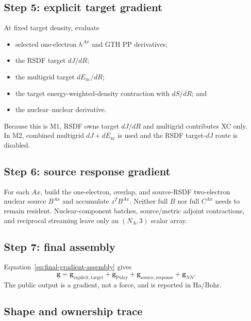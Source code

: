 \subsection{Step 5: explicit target gradient}

At fixed target density, evaluate
\begin{itemize}
  \item selected one-electron $h^{Ax}$ and GTH PP derivatives;
  \item the RSDF target $dJ/dR$;
  \item the multigrid target $dE_{\mathrm{xc}}/dR$;
  \item the target energy-weighted-density contraction with $dS/dR$; and
  \item the nuclear--nuclear derivative.
\end{itemize}
Because this is M1, RSDF owns target $dJ/dR$ and multigrid contributes XC
only.  In M2, combined multigrid $dJ+dE_{\mathrm{xc}}$ is used and the RSDF
target-$dJ$ route is disabled.

\subsection{Step 6: source response gradient}

For each $Ax$, build the one-electron, overlap, and source-RSDF two-electron
nuclear source $B^{Ax}$ and accumulate $z^TB^{Ax}$.  Neither full $B$ nor full
$C^{Ax}$ needs to remain resident.  Nuclear-component batches, source/metric
adjoint contractions, and reciprocal streaming leave only an $(N_A,3)$
scalar array.

\subsection{Step 7: final assembly}

Equation~\eqref{eq:final-gradient-assembly} gives
\begin{equation}
  \mathbf g
  =\mathbf g_{\mathrm{explicit,target}}
   +\mathbf g_{\mathrm{Pulay}}
   +\mathbf g_{\mathrm{source,response}}
   +\mathbf g_{NN}.
\end{equation}
The public output is a gradient, not a force, and is reported in Ha/Bohr.

\subsection{Shape and ownership trace}

